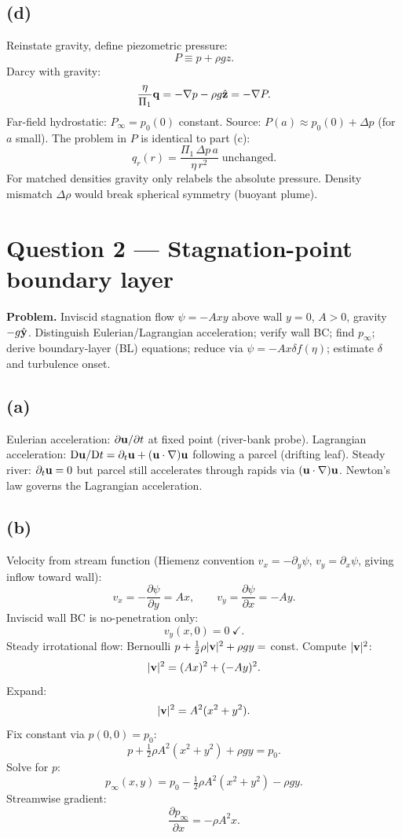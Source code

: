 \documentclass[11pt]{article}
\newcommand{\D}{\mathrm{D}}
\newcommand{\pd}[2]{\frac{\partial #1}{\partial #2}}
\begin{document}
\subsection*{(d)}

Reinstate gravity, define piezometric pressure:
\[ P \equiv p + \rho g z. \]
Darcy with gravity:
\[ \frac{\eta}{\Pi_1}\vb q = -\nabla p - \rho g\hat{\vb z} = -\nabla P. \]
Far-field hydrostatic: $P_\infty = p_0(0)$ constant. Source: $P(a)\approx p_0(0)+\Delta p$ (for $a$ small). The problem in $P$ is identical to part (c):
\[ \boxed{\;q_r(r) = \frac{\Pi_1\,\Delta p\,a}{\eta\,r^2}\;\text{unchanged.}\;} \]
For matched densities gravity only relabels the absolute pressure. Density mismatch $\Delta\rho$ would break spherical symmetry (buoyant plume).

\section*{Question 2 --- Stagnation-point boundary layer}

\textbf{Problem.} Inviscid stagnation flow $\psi=-Axy$ above wall $y=0$, $A>0$, gravity $-g\hat{\vb y}$. Distinguish Eulerian/Lagrangian acceleration; verify wall BC; find $p_\infty$; derive boundary-layer (BL) equations; reduce via $\psi=-Ax\delta f(\eta)$; estimate $\delta$ and turbulence onset.

\subsection*{(a)}

Eulerian acceleration: $\partial\vb u/\partial t$ at fixed point (river-bank probe).
Lagrangian acceleration: $\D\vb u/\D t = \partial_t\vb u + (\vb u\cdot\nabla)\vb u$ following a parcel (drifting leaf).
Steady river: $\partial_t\vb u=0$ but parcel still accelerates through rapids via $(\vb u\cdot\nabla)\vb u$. Newton's law governs the Lagrangian acceleration.

\subsection*{(b)}

Velocity from stream function (Hiemenz convention $v_x=-\partial_y\psi$, $v_y=\partial_x\psi$, giving inflow toward wall):
\[ v_x = -\pd{\psi}{y} = Ax, \qquad v_y = \pd{\psi}{x} = -Ay. \]
Inviscid wall BC is no-penetration only:
\[ v_y(x,0) = 0\ \checkmark. \]
Steady irrotational flow: Bernoulli $p+\tfrac12\rho|\vb v|^2+\rho g y =$ const.
Compute $|\vb v|^2$:
\[ |\vb v|^2 = (Ax)^2 + (-Ay)^2. \]
Expand:
\[ |\vb v|^2 = A^2(x^2+y^2). \]
Fix constant via $p(0,0)=p_0$:
\[ p + \tfrac12\rho A^2(x^2+y^2) + \rho g y = p_0. \]
Solve for $p$:
\[ \boxed{\;p_\infty(x,y) = p_0 - \tfrac12\rho A^2(x^2+y^2) - \rho g y.\;} \]
Streamwise gradient:
\[ \pd{p_\infty}{x} = -\rho A^2 x. \]
\end{document}
